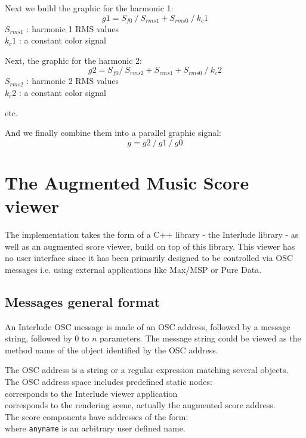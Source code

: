 \documentclass{article}
\newcommand{\rshift}			{\hspace*{9mm}}
\newcommand{\sshift}			{\hspace*{4mm}}
\newcommand{\osc}[1]			{{\small \texttt{#1}}}
\begin{document}
\vspace{2mm}
Next we build the graphic for the harmonic 1:
\[ g1 = S_{f0} \ /\ S_{rms1} + S_{rms0}\ /\ k_c1 \]
\rshift	 $S_{rms1}$ : harmonic 1 RMS values \\
\rshift $k_c1$ : a constant color signal

\vspace{2mm}
Next, the graphic for the harmonic 2:
\[ g2 = S_{f0} /\ S_{rms2} + S_{rms1}  + S_{rms0} \ /\ k_c2 \]
\rshift	 $S_{rms2}$ : harmonic 2 RMS values\\
\rshift $k_c2$ : a constant color signal 

\vspace{1mm}
etc.

\vspace{2mm}
And we finally combine them into a parallel graphic signal:
\[ g = g2 \ /\  g1 \ /\ g0 \]



\section{The Augmented Music Score viewer}

The implementation takes the form of a C++ library - the Interlude library - as well as an augmented score viewer, build on top of this library. This viewer has no user interface since it has been primarily designed to be controlled via OSC messages i.e. using external applications like Max/MSP or Pure Data.

\subsection{Messages general format}

An Interlude OSC message is made of an OSC address, followed by a message string, followed by $0$ to $n$ parameters. The message string could be viewed as the method name of the object identified by the OSC address. 

The OSC address is a string or a regular expression matching several objects.
The OSC address space includes predefined static nodes:\\
\sshift \osc{/ITL} corresponds to the Interlude viewer application \\
\sshift \osc{/ITL/scene} corresponds to the rendering scene, actually the augmented score address.\\
The score components have addresses of the form: \\
\sshift \osc{/ITL/scene/anyname} where \osc{anyname} is an arbitrary user defined name.
\end{document}
